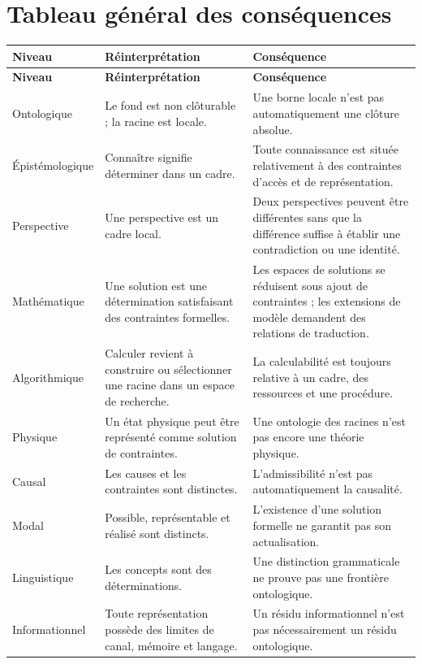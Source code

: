 \documentclass[11pt,a4paper]{article}
\begin{document}
\section{Tableau général des conséquences}

\renewcommand{\arraystretch}{1.18}
\begin{longtable}{>{\raggedright\arraybackslash}p{}
                  >{\raggedright\arraybackslash}p{}
                  >{\raggedright\arraybackslash}p{}}
\toprule
\textbf{Niveau} & \textbf{Réinterprétation} & \textbf{Conséquence}\\
\midrule
\endfirsthead
\toprule
\textbf{Niveau} & \textbf{Réinterprétation} & \textbf{Conséquence}\\
\midrule
\endhead
Ontologique & Le fond est non clôturable ; la racine est locale. & Une borne locale n'est pas automatiquement une clôture absolue.\\
Épistémologique & Connaître signifie déterminer dans un cadre. & Toute connaissance est située relativement à des contraintes d'accès et de représentation.\\
Perspective & Une perspective est un cadre local. & Deux perspectives peuvent être différentes sans que la différence suffise à établir une contradiction ou une identité.\\
Mathématique & Une solution est une détermination satisfaisant des contraintes formelles. & Les espaces de solutions se réduisent sous ajout de contraintes ; les extensions de modèle demandent des relations de traduction.\\
Algorithmique & Calculer revient à construire ou sélectionner une racine dans un espace de recherche. & La calculabilité est toujours relative à un cadre, des ressources et une procédure.\\
Physique & Un état physique peut être représenté comme solution de contraintes. & Une ontologie des racines n'est pas encore une théorie physique.\\
Causal & Les causes et les contraintes sont distinctes. & L'admissibilité n'est pas automatiquement la causalité.\\
Modal & Possible, représentable et réalisé sont distincts. & L'existence d'une solution formelle ne garantit pas son actualisation.\\
Linguistique & Les concepts sont des déterminations. & Une distinction grammaticale ne prouve pas une frontière ontologique.\\
Informationnel & Toute représentation possède des limites de canal, mémoire et langage. & Un résidu informationnel n'est pas nécessairement un résidu ontologique.\\

\end{longtable}
\end{document}

